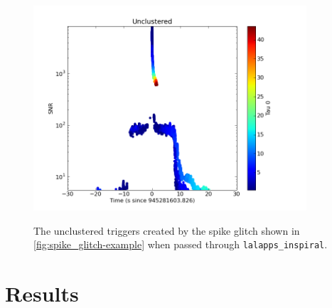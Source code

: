 \begin{figure}[hp]
\center
\includegraphics[width=4in]{figures/spike_glitch/L1_945281603.png}
\label{fig:spike_glitch-cbc_response}
\caption{The unclustered triggers created by the spike glitch shown in \ref{fig:spike_glitch-example} when passed through \texttt{lalapps\_inspiral}.}
\end{figure}

%

\section{Results}

